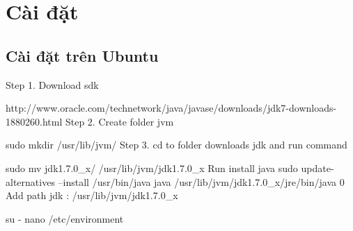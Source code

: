 \chapter{Cài đặt}

\section{Cài đặt trên Ubuntu}

Step 1. Download sdk

http://www.oracle.com/technetwork/java/javase/downloads/jdk7-downloads-1880260.html
Step 2. Create folder jvm

sudo mkdir /usr/lib/jvm/
Step 3. cd to folder downloads jdk and run command

sudo mv jdk1.7.0_x/ /usr/lib/jvm/jdk1.7.0_x
Run install java
sudo update-alternatives --install /usr/bin/java java /usr/lib/jvm/jdk1.7.0_x/jre/bin/java 0
Add path jdk : /usr/lib/jvm/jdk1.7.0_x

su -
nano /etc/environment